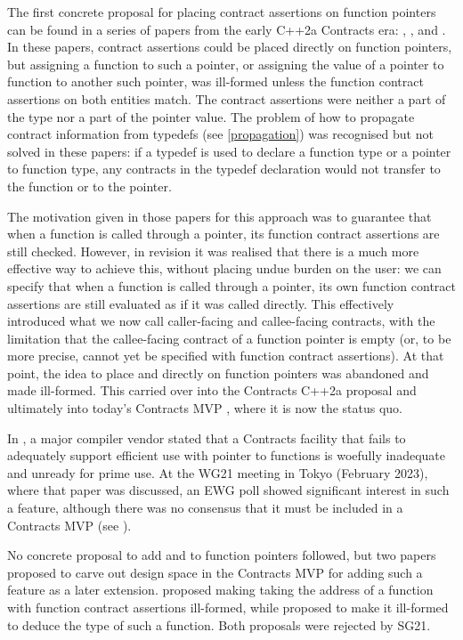 The first concrete proposal for placing contract assertions on function pointers can be found in a series of papers from the early C++2a Contracts era: \cite{N4415}, \cite{P0287R0}, and \cite{P0380R0}. In these papers, contract assertions could be placed directly on function pointers, but assigning a function to such a pointer, or assigning the value of a pointer to function to another such pointer, was ill-formed unless the function contract assertions on both entities match. The contract assertions were neither a part of the type nor a part of the pointer value. The problem of how to propagate contract information from typedefs (see \ref{propagation}) was recognised but not solved in these papers:  if a typedef is used to declare a function type or a pointer to function type, any contracts in the typedef declaration would not transfer to the function or to the pointer.

The motivation given in those papers for this approach was to guarantee that when a function is called through a pointer, its function contract assertions are still checked. However, in revision \cite{P0380R1} it was realised that there is a much more effective way to achieve this, without placing undue burden on the user: we can specify that when a function is called through a pointer, its own function contract assertions are still evaluated as if it was called directly. This effectively introduced what we now call caller-facing and callee-facing contracts, with the limitation that the callee-facing contract of a function pointer is empty (or, to be more precise, cannot yet be specified with function contract assertions). At that point, the idea to place  and  directly on function pointers was abandoned and made ill-formed. This carried over into the Contracts C++2a proposal \cite{P0542R5} and ultimately into today's Contracts MVP \cite{P2900R8}, where it is now the status quo.

In \cite{P3173R0}, a major compiler vendor stated that a Contracts facility that fails to adequately support efficient use with pointer to functions is woefully inadequate and unready for prime use. At the WG21 meeting in Tokyo (February 2023), where that paper was discussed, an EWG poll showed significant interest in such a feature, although there was no consensus that it must be included in a Contracts MVP (see \cite{P3197R0}).

No concrete proposal to add  and  to function pointers followed, but two papers proposed to carve out design space in the Contracts MVP for adding such a feature as a later extension. \cite{P3221R0} proposed making taking the address of a function with function contract assertions ill-formed, while \cite{P3250R0} proposed to make it ill-formed to deduce the type of such a function. Both proposals were rejected by SG21.

